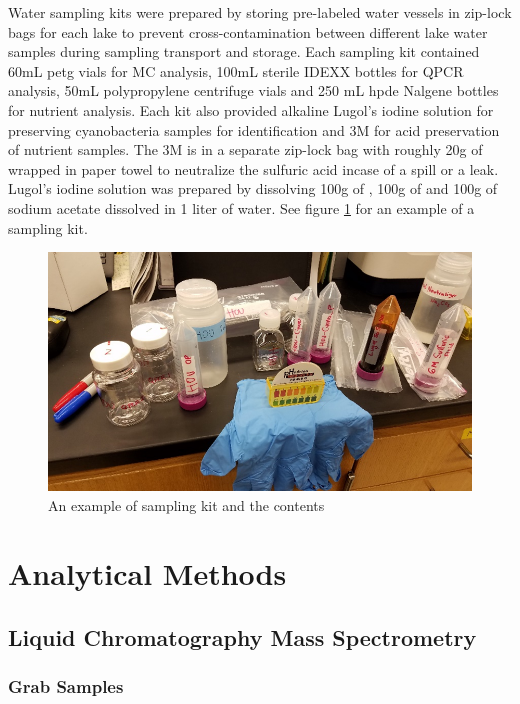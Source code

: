 Water sampling kits were prepared by storing pre-labeled water vessels in zip-lock bags for each lake to prevent cross-contamination between different lake water samples during sampling transport and storage. Each sampling kit contained 60mL \gls{petg} vials for MC analysis, 100mL sterile IDEXX bottles for QPCR analysis, 50mL polypropylene centrifuge vials and 250 mL \gls{hpde} Nalgene bottles for nutrient analysis. Each kit also provided alkaline Lugol's iodine solution for preserving cyanobacteria samples for identification and 3M  for acid preservation of nutrient samples. The 3M  is in a separate zip-lock bag with roughly 20g of  wrapped in paper towel to neutralize the sulfuric acid incase of a spill or a leak. Lugol's iodine solution was prepared by dissolving 100g of , 100g of  and 100g of sodium acetate dissolved in 1 liter of water. See figure \ref{fig:samplekit} for an example of a sampling kit.

\begin{figure}[!h]
\includegraphics[width=\textwidth]{figures/samplekit}
\caption{An example of sampling kit and the contents}
\label{fig:samplekit}
\end{figure}


\section{Analytical Methods}

\subsection{Liquid Chromatography Mass Spectrometry} \label{sc:lcms}

\subsubsection{Grab Samples}

